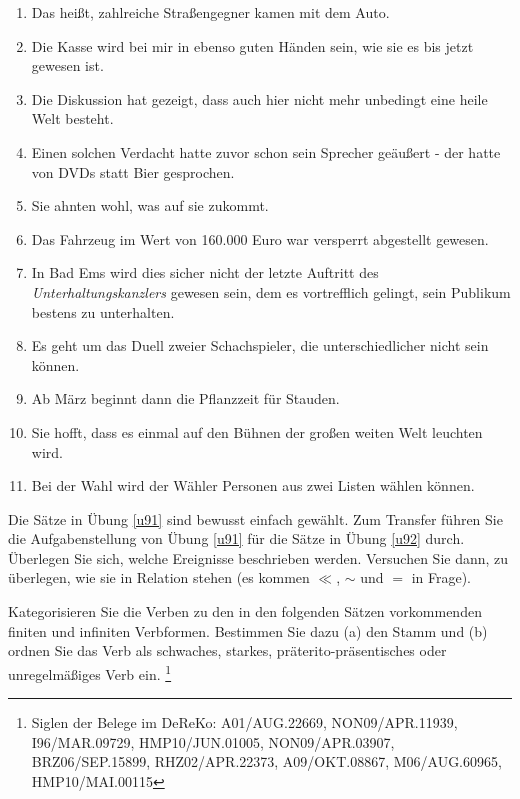 \begin{sloppypar}
\begin{enumerate}\Lf
  \item Das heißt, zahlreiche Straßengegner kamen mit dem Auto.
  \item Die Kasse wird bei mir in ebenso guten Händen sein, wie sie es bis jetzt gewesen ist.
  \item Die Diskussion hat gezeigt, dass auch hier nicht mehr unbedingt eine heile Welt besteht.
  \item Einen solchen Verdacht hatte zuvor schon sein Sprecher geäußert - der hatte von DVDs statt Bier gesprochen.
  \item Sie ahnten wohl, was auf sie zukommt.
  \item Das Fahrzeug im Wert von 160.000 Euro war versperrt abgestellt gewesen.
  \item In Bad Ems wird dies sicher nicht der letzte Auftritt des \textit{Unterhaltungskanzlers} gewesen sein, dem es vortrefflich gelingt, sein Publikum bestens zu unterhalten.
  \item Es geht um das Duell zweier Schachspieler, die unterschiedlicher nicht sein können.
  \item Ab März beginnt dann die Pflanzzeit für Stauden.
  \item Sie hofft, dass es einmal auf den Bühnen der großen weiten Welt leuchten wird.
  \item Bei der Wahl wird der Wähler Personen aus zwei Listen wählen können.
\end{enumerate}

\Uebung[\tristar] \label{u93} Die Sätze in Übung \ref{u91} sind bewusst einfach gewählt.
Zum Transfer führen Sie die Aufgabenstellung von Übung \ref{u91} für die Sätze in Übung \ref{u92} durch.
Überlegen Sie sich, welche Ereignisse beschrieben werden.
Versuchen Sie dann, zu überlegen, wie sie in Relation stehen (es kommen $\ll$, $\sim$ und $=$ in Frage).

\Uebung \label{u94} Kategorisieren Sie die Verben zu den in den folgenden Sätzen vorkommenden finiten und infiniten Verbformen.
Bestimmen Sie dazu (a) den Stamm und (b) ordnen Sie das Verb als schwaches, starkes, präterito-präsentisches oder unregelmäßiges Verb ein.%
\footnote{Siglen der Belege im DeReKo: A01\slash AUG.22669, NON09\slash APR.11939, I96\slash MAR.09729, HMP10\slash JUN.01005, NON09\slash APR.03907, BRZ06\slash SEP.15899, RHZ02\slash APR.22373, A09\slash OKT.08867, M06\slash AUG.60965, HMP10\slash MAI.00115}


\end{sloppypar}
